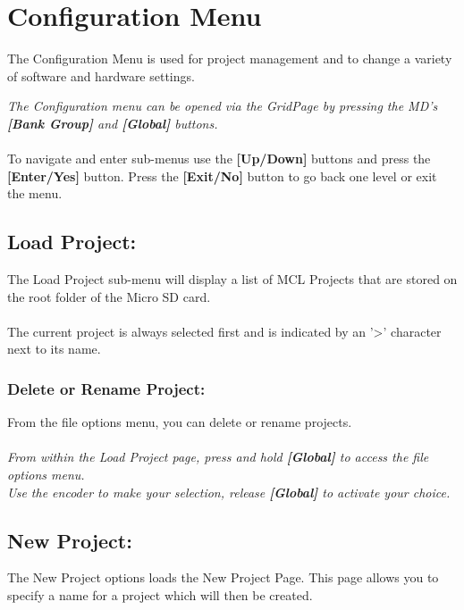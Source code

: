 \chapter{Configuration Menu}
The Configuration Menu is used for project management and to change a variety of software and hardware settings.


\textit{The Configuration menu can be opened via the GridPage by pressing the MD's \textbf{[Bank Group] }and\textbf{ [Global]} buttons.}\\\\
To navigate and enter sub-menus use the \textbf{[Up/Down]} buttons and press the \textbf{[Enter/Yes]} button. Press the \textbf{[Exit/No]} button to go back one level or exit the menu.
\section{Load Project:}
The Load Project sub-menu will display a list of MCL Projects that are stored on the root folder of the Micro SD card.\\\\
The current project is always selected first and is indicated by an '>' character next to its name.

\subsection{Delete or Rename Project:}
From the file options menu, you can delete or rename projects.\\\\
\textit{From within the Load Project page, press and hold \textbf{[Global]} to access the file options menu.\\
Use the encoder to make your selection, release \textbf{[Global]} to activate your choice.}

\newpage
\section{New Project:}
The New Project options loads the New Project Page. This page allows you to specify a name for a project which will then be created.\\

